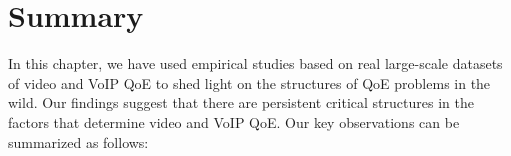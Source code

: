 %








\section{Summary}
\label{sec:measurement:summary}

In this chapter, we have used empirical studies based on real large-scale datasets 
of video and VoIP QoE to shed light on the structures of QoE problems in the wild.
Our findings suggest that there are persistent critical structures in the factors that 
determine video and VoIP QoE. Our key observations can be summarized as follows:

